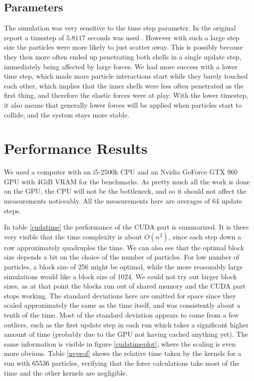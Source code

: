 \documentclass[a4paper]{article}
\begin{document}
\subsection{Parameters}

The simulation was very sensitive to the time step parameter. 
In the original report a timestep of $5.8117$ seconds was used \cite{simulation_paper}. 
However with such a large step size the particles were more likely to just scatter away. 
This is possibly because they then more often ended up penetrating both shells in a single update step, immediately being affected by large forces.
We had more success with a lower time step, which made more particle interactions start while they barely touched each other, which implies that the inner shells were less often penetrated as the first thing, and therefore the elastic forces were at play.
With the lower timestep, it also means that generally lower forces will be applied when particles start to collide, and the system stays more stable.



\section{Performance Results}
We used a computer with an i5-2500k CPU and an Nvidia GeForce GTX 960 GPU with 4GiB VRAM for the benchmarks.
As pretty much all the work is done on the GPU, the CPU will not be the bottleneck, and so it should not affect the measurements noticeably.
All the measurements here are averages of 64 update steps.

In table \ref{cudatime} the performance of the CUDA part is summarized.
It is there very visible that the time complexity is about $O(n^2)$, since each step down a row approximately quadruples the time.
We can also see that the optimal block size depends a bit on the choice of the number of particles.
For low number of particles, a block size of 256 might be optimal, while the more reasonably large simulations would like a block size of 1024.
We could not try out larger block sizes, as at that point the blocks run out of shared memory and the CUDA part stops working.
The standard deviations here are omitted for space since they scaled approximately the same as the time itself, and was consistently about a tenth of the time.
Most of the standard deviation appears to come from a few outliers, such as the first update step in each run which takes a significant higher amount of time (probably due to the GPU not having cached anything yet).
The same information is visible in figure \ref{cudatimeplot}, where the scaling is even more obvious.
Table \ref{nvprof} shows the relative time taken by the kernels for a run with 65536 particles, verifying that the force calculations take most of the time and the other kernels are negligible.
\end{document}
